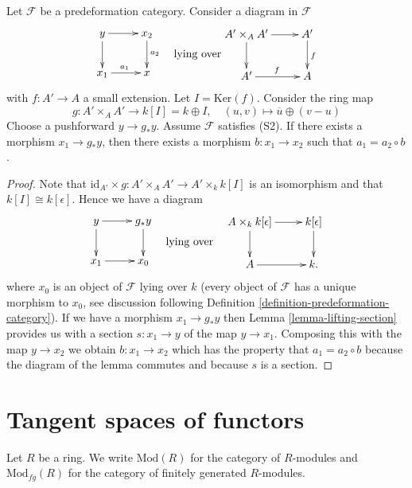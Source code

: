 \begin{lemma}
\label{lemma-lifting-along-small-extension}
Let $\mathcal{F}$ be a predeformation category.
Consider a diagram in $\mathcal{F}$
$$
\vcenter{
\xymatrix{
y \ar[r] \ar[d] & x_2 \ar[d]^{a_2} \\
x_1 \ar[r]^{a_1}        & x
}
}
\quad\text{lying over}
\vcenter{
\xymatrix{
A' \times_{A} A' \ar[r] \ar[d] & A' \ar[d]^{f} \\
A' \ar[r]^{f} & A
}
}
$$
with $f: A' \to A$ a small extension. Let $I = \text{Ker}(f)$. Consider
the ring map
$$
g : A' \times_{A} A' \longrightarrow k[I] = k \oplus I,\quad
(u, v) \longmapsto \overline{u} \oplus (v - u)
$$
Choose a pushforward $y \to g_*y$. Assume $\mathcal{F}$ satisfies (S2).
If there exists a morphism $x_1 \to g_*y$, then there exists a
morphism $b: x_1 \to x_2$ such that $a_1 =  a_2 \circ b$.
\end{lemma}

\begin{proof}
Note that $\text{id}_{A'} \times g: A' \times_{A} A' \to A' \times_{k} k[I]$
is an isomorphism and that $k[I] \cong k[\epsilon]$. Hence we have a diagram
$$
\vcenter{
\xymatrix{
y \ar[r] \ar[d] & g_*y \ar[d] \\
x_1 \ar[r]        & x_0
}
}
\quad\text{lying over}\quad
\vcenter{
\xymatrix{
A \times_k k[\epsilon] \ar[r] \ar[d] & k[\epsilon] \ar[d] \\
A \ar[r] & k.
}
}
$$
where $x_0$ is an object of $\mathcal{F}$ lying over $k$ (every object
of $\mathcal{F}$ has a unique morphism to $x_0$, see
discussion following Definition \ref{definition-predeformation-category}).
If we have a morphism $x_1 \to g_*y$ then
Lemma \ref{lemma-lifting-section}
provides us with a section $s : x_1 \to y$ of the map $y \to x_1$.
Composing this with the map $y \to x_2$ we obtain $b : x_1 \to x_2$
which has the property that $a_1 =  a_2 \circ b$ because
the diagram of the lemma commutes and because $s$ is a section.
\end{proof}





\section{Tangent spaces of functors}
\label{section-tangent-spaces-functors}

\noindent
Let $R$ be a ring. We write $\text{Mod}(R)$ for the category of 
$R$-modules and $\text{Mod}_{fg}(R)$ for the category of finitely 
generated $R$-modules.

